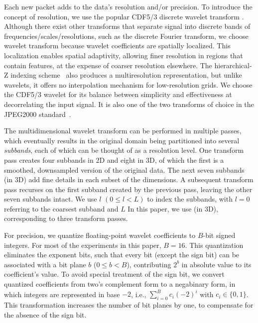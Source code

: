 Each new packet adds to the data's resolution and/or precision. To introduce
the concept of resolution, we use the popular CDF5/3 discrete wavelet transform
\todo{[CITE]}.  Although there exist other transforms that separate signal
into discrete bands of frequencies/scales/resolutions, such as the discrete
Fourier transform, we choose wavelet transform because wavelet coefficients are
spatially localized. This localization enables spatial adaptivity, allowing
finer resolution in regions that contain  
features, at the expense of coarser resolution elsewhere. The hierarchical-Z
indexing scheme~\cite{idx2001} also produces a multiresolution representation,
but unlike wavelets, it offers no interpolation mechanism for low-resolution
grids. We choose the CDF5/3 wavelet for its balance between simplicity and
effectiveness at decorrelating the input signal. It is also one of the two
transforms of choice in the JPEG2000 standard~\cite{jpeg2001}.

The  multidimensional wavelet transform can be performed in
multiple passes, which eventually results in the original domain being
partitioned into several \emph{subbands}, each of which can be thought of as a
resolution level. One transform pass creates four subbands in 2D and eight in
3D, of which the first is a smoothed, downsampled version of the original data.
The next seven subbands (in 3D) add fine details in each subset of the
dimensions. A subsequent transform pass  recurses on the first
subband created by the previous pass, leaving the other seven subbands intact.
We  use $l$ $(0 \leq l < L)$ to index the subbands, with $l =
0$ referring to the coarsest subband and $L$   In this paper, we use
  (in 3D), corresponding to three transform passes.

For  precision, we quantize
floating-point wavelet coefficients to $B$-bit signed integers. For most of the
experiments in this paper, $B=16$. This quantization eliminates the exponent
bits, such that every bit (except the sign bit) can be associated with a bit
plane $b$ ($0\leq b < B$), contributing $2^b$ in absolute value to its
coefficient's value. To avoid special treatment of the sign bit, we
convert quantized coefficients from two's complement form to a negabinary form,
in which integers are represented in base $-2$, i.e.,
$\sum_{i=0}^{B}{c_i(-2)^i}$ with $c_i\in \{0,1\}$. This transformation
increases the number of bit planes by one, to compensate for the absence of the
sign bit.    

